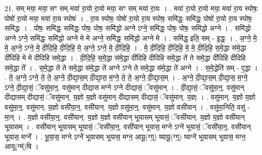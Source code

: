 \documentclass[17pt]{extarticle}
\begin{document}
21. सम् मया॒ मया॒ सꣳ सम् मया॑ रा॒यो रा॒यो मया॒ सꣳ सम् मया॑ रा॒यः । . मया॑ रा॒यो रा॒यो मया॒ मया॑ रा॒य स्पोषः॒ पोषो॑ रा॒यो मया॒ मया॑ रा॒य स्पोषः॑ । . रा॒य स्पोषः॒ पोषो॑ रा॒यो रा॒य स्पोषः॒ समि॑द्धः॒ समि॑द्धः॒ पोषो॑ रा॒यो रा॒य स्पोषः॒ समि॑द्धः । . पोषः॒ समि॑द्धः॒ समि॑द्धः॒ पोषः॒ पोषः॒ समि॑द्धो अग्ने ऽग्ने॒ समि॑द्धः॒ पोषः॒ पोषः॒ समि॑द्धो अग्ने । . समि॑द्धो अग्ने ऽग्ने॒ समि॑द्धः॒ समि॑द्धो अग्ने मे मे अग्ने॒ समि॑द्धः॒ समि॑द्धो अग्ने मे । . समि॑द्ध॒ इति॒ सम् - इ॒द्धः॒ । . अ॒ग्ने॒ मे॒ मे॒ अ॒ग्ने॒ ऽग्ने॒ मे॒ दी॒दि॒हि॒ दी॒दि॒हि॒ मे॒ अ॒ग्ने॒ ऽग्ने॒ मे॒ दी॒दि॒हि॒ । . मे॒ दी॒दि॒हि॒ दी॒दि॒हि॒ मे॒ मे॒ दी॒दि॒हि॒ स॒मे॒द्धा स॑मे॒द्धा दी॑दिहि मे मे दीदिहि समे॒द्धा । . दी॒दि॒हि॒ स॒मे॒द्धा स॑मे॒द्धा दी॑दिहि दीदिहि समे॒द्धा ते॑ ते समे॒द्धा दी॑दिहि दीदिहि समे॒द्धा ते᳚ । . स॒मे॒द्धा ते॑ ते समे॒द्धा स॑मे॒द्धा ते॑ अग्ने ऽग्ने ते समे॒द्धा स॑मे॒द्धा ते॑ अग्ने । . स॒मे॒द्धेति॑ सम् - ए॒द्धा । . ते॒ अ॒ग्ने॒ ऽग्ने॒ ते॒ ते॒ अ॒ग्ने॒ दी॒द्या॒स॒म् दी॒द्या॒स॒ म॒ग्ने॒ ते॒ ते॒ अ॒ग्ने॒ दी॒द्या॒स॒म् । . अ॒ग्ने॒ दी॒द्या॒स॒म् दी॒द्या॒स॒ म॒ग्ने॒ ऽग्ने॒ दी॒द्या॒सं॒ ॅवसु॑मा॒न्॒. वसु॑मान् दीद्यास मग्ने ऽग्ने दीद्यासं॒ ॅवसु॑मान् । . दी॒द्या॒सं॒ ॅवसु॑मा॒न्॒. वसु॑मान् दीद्यासम् दीद्यासं॒ ॅवसु॑मान्. य॒ज्ञो य॒ज्ञो वसु॑मान् दीद्यासम् दीद्यासं॒ ॅवसु॑मान्. य॒ज्ञ्ः । . वसु॑मान्. य॒ज्ञो य॒ज्ञो वसु॑मा॒न्॒. वसु॑मान्. य॒ज्ञो वसी॑या॒न्॒. वसी॑यान्. य॒ज्ञो वसु॑मा॒न्॒. वसु॑मान्. य॒ज्ञो वसी॑यान् । . वसु॑मा॒निति॒ वसु॑ - मा॒न् । . य॒ज्ञो वसी॑या॒न्॒. वसी॑यान्. य॒ज्ञो य॒ज्ञो वसी॑यान् भूयासम् भूयासं॒ ॅवसी॑यान्. य॒ज्ञो य॒ज्ञो वसी॑यान् भूयासम् । . वसी॑यान् भूयासम् भूयासं॒ ॅवसी॑या॒न्॒. वसी॑यान् भूयास॒ मग्ने ऽग्ने॑ भूयासं॒ ॅवसी॑या॒न्॒. वसी॑यान् भूयास॒ मग्ने᳚ । . भू॒या॒स॒ मग्ने ऽग्ने॑ भूयासम् भूयास॒ मग्न॒ आयू॒(ग्ग्॒) ष्यायू॒(ग्ग्॒) ष्यग्ने॑ भूयासम् भूयास॒ मग्न॒ आयू(ग्म्॑)षि । \newline
\end{document}
